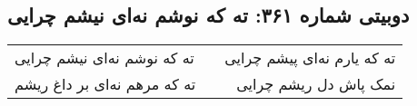 \begin{center}
\section*{دوبیتی شماره ۳۶۱: ته که نوشم نه‌ای نیشم چرایی}
\label{sec:361}
\begin{longtable}{l p{0.5cm} r}
ته که نوشم نه‌ای نیشم چرایی
&&
ته که یارم نه‌ای پیشم چرایی
\\
ته که مرهم نه‌ای بر داغ ریشم
&&
نمک پاش دل ریشم چرایی
\\
\end{longtable}
\end{center}
